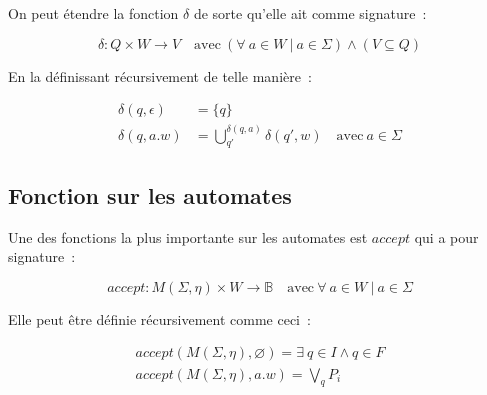 \documentclass[12pt]{article}
\begin{document}
\vphantom{}

On peut étendre la fonction \(\delta\) de sorte qu'elle ait comme signature~:

\[
    \delta: Q \times W \to V \quad \text{avec}~ (\forall~a \in W ~|~ a \in \Sigma) \land (V \subseteq Q)
\]

En la définissant récursivement de telle manière~:

\begin{align}
    \delta(q, \epsilon) & = \{q\}                                                                     \\
    \delta(q, a.w)      & = \bigcup_{q'}^{\delta(q, a)} \delta(q', w) \quad \text{avec}~ a \in \Sigma
\end{align}

\subsection{Fonction sur les automates}

Une des fonctions la plus importante sur les automates est \(accept\) qui a
pour signature~:

\[
    accept: M(\Sigma, \eta) \times W \to \mathbb{B} \quad \text{avec}~ \forall~a \in W ~|~ a \in \Sigma
\]

Elle peut être définie récursivement comme ceci~:

\begin{align}
    accept(M(\Sigma, \eta), \varnothing) = \exists~q \in I \land q\in F \\
    accept(M(\Sigma, \eta), a.w) = \bigvee_{q}^{} P_i
\end{align}
\end{document}
